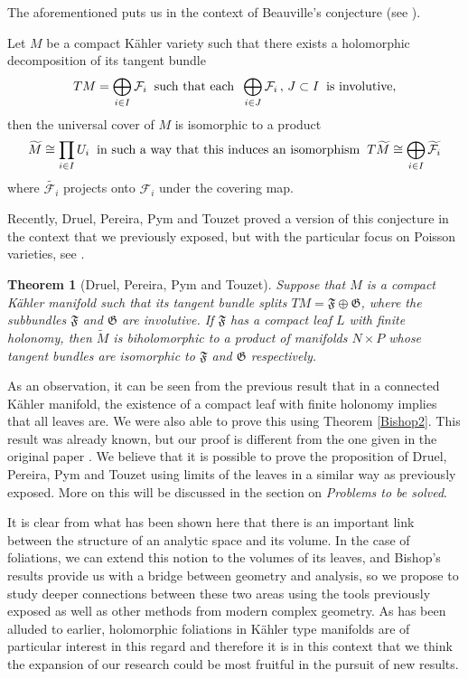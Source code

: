 \documentclass[12pt,twoside,a4paper]{report}
\newtheorem{theorem}{Theorem}[section]
\begin{document}
The aforementioned puts us in the context of Beauville's conjecture (see \cite{Beuville}).
\begin{conjecture}[Beauville]\label{Beauville}
        Let $M$ be a compact Kähler variety such that there exists a holomorphic decomposition of its tangent bundle
        \[
        TM=\bigoplus_{i\in I}\mathcal{F}_i\hspace{0.2cm}\text{such that each}\hspace{0.2cm}\bigoplus_{i\in J}\mathcal{F}_i\,,\,J\subset I\hspace{0.2cm}\text{is involutive},
        \]
        then the universal cover of $M$ is isomorphic to a product
        \[
        \widetilde{M}\cong\prod_{i\in I}U_i\hspace{0.2cm}\text{in such a way that this induces an isomorphism}\hspace{0.2cm}T\widetilde{M}\cong\bigoplus_{i\in I}\widetilde{\mathcal{F}_i}
      \]
      where $\widetilde{\mathcal{F}_{i}}$ projects onto $\mathcal{F}_{i}$ under the covering map.
\end{conjecture}
Recently, Druel, Pereira, Pym and Touzet proved a version of this conjecture in the context that we previously exposed,
but with the particular focus on Poisson varieties, see \cite{DPPT}.
\begin{theorem}[Druel, Pereira, Pym and Touzet]\label{DPPT}
        Suppose that $M$ is a compact Kähler manifold such that its tangent bundle splits $TM=\mathfrak{F}\oplus\mathfrak{G}$, where
        the subbundles $\mathfrak{F}$ and $\mathfrak{G}$ are involutive. If $\mathfrak{F}$ has a compact leaf $L$ with finite holonomy,
        then $\widetilde{M}$ is biholomorphic to a product of manifolds $N\times P$ whose tangent bundles are isomorphic
        to $\mathfrak{F}$ and $\mathfrak{G}$ respectively.
\end{theorem}
\noindent As an observation, it can be seen from the previous result that in a connected Kähler manifold, the existence
of a compact leaf with finite holonomy implies that all leaves are. We were also able to prove this using
Theorem \ref{Bishop2}. This result was already known, but our proof is different from the one given in the
original paper \cite{Pereira}.
We believe that it is possible to prove the proposition of Druel, Pereira, Pym and Touzet using limits of the leaves
in a similar way as previously exposed. More on this will be discussed in the section on \textit{Problems to be solved}.

It is clear from what has been shown here that there is an important link between the structure of an analytic space and its volume.
In the case of foliations, we can extend this notion to the volumes of its leaves, and Bishop's results
provide us with a bridge between geometry and analysis, so we propose to study deeper connections between these
two areas using the tools previously exposed as well as other methods from modern complex geometry.
As has been alluded to earlier, holomorphic foliations in Kähler type manifolds are of particular interest in this regard
and therefore it is in this context that we think the expansion of our research could be most fruitful in the
pursuit of new results.
\end{document}
